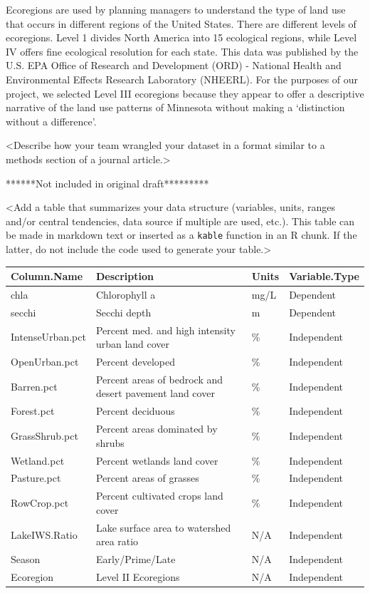 \documentclass[12pt,]{article}
\begin{document}
Ecoregions are used by planning managers to understand the type of land
use that occurs in different regions of the United States. There are
different levels of ecoregions. Level 1 divides North America into 15
ecological regions, while Level IV offers fine ecological resolution for
each state. This data was published by the U.S. EPA Office of Research
and Development (ORD) - National Health and Environmental Effects
Research Laboratory (NHEERL). For the purposes of our project, we
selected Level III ecoregions because they appear to offer a descriptive
narrative of the land use patterns of Minnesota without making a
`distinction without a difference'.

\textless Describe how your team wrangled your dataset in a format
similar to a methods section of a journal article.\textgreater{}

******Not included in original draft*********

\textless Add a table that summarizes your data structure (variables,
units, ranges and/or central tendencies, data source if multiple are
used, etc.). This table can be made in markdown text or inserted as a
\texttt{kable} function in an R chunk. If the latter, do not include the
code used to generate your table.\textgreater{}

\begin{longtable}[]{@{}llll@{}}
\toprule
Column.Name & Description & Units & Variable.Type\tabularnewline
\midrule
\endhead
chla & Chlorophyll a & mg/L & Dependent\tabularnewline
secchi & Secchi depth & m & Dependent\tabularnewline
IntenseUrban.pct & Percent med. and high intensity urban land cover & \%
& Independent\tabularnewline
OpenUrban.pct & Percent developed & \% & Independent\tabularnewline
Barren.pct & Percent areas of bedrock and desert pavement land cover &
\% & Independent\tabularnewline
Forest.pct & Percent deciduous & \% & Independent\tabularnewline
GrassShrub.pct & Percent areas dominated by shrubs & \% &
Independent\tabularnewline
Wetland.pct & Percent wetlands land cover & \% &
Independent\tabularnewline
Pasture.pct & Percent areas of grasses & \% & Independent\tabularnewline
RowCrop.pct & Percent cultivated crops land cover & \% &
Independent\tabularnewline
LakeIWS.Ratio & Lake surface area to watershed area ratio & N/A &
Independent\tabularnewline
Season & Early/Prime/Late & N/A & Independent\tabularnewline
Ecoregion & Level II Ecoregions & N/A & Independent\tabularnewline
\bottomrule
\end{longtable}

\newpage
\end{document}
